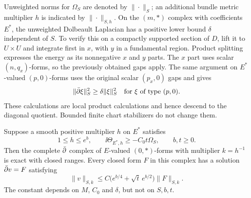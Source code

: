 Unweighted norms for $\Omega_S$ are denoted by $\|\cdot\|_S$; an
additional bundle metric multiplier $h$ is indicated by
$\|\cdot\|_{S,h}$.  On the $(m,*)$ complex with coefficients $E^*$,
the unweighted Dolbeault Laplacian has a positive lower bound $\delta$
independent of $S$.  To verify this on a compactly supported section of
$D$, lift it to $U\times U$ and integrate first in $x$, with $y$ in a
fundamental region.  Product splitting expresses the energy as its
nonnegative $x$ and $y$ parts.  The $x$ part uses scalar $(n,q_x)$-forms,
so the previously obtained gaps apply.  The same argument on
$E^*$-valued $(p,0)$-forms uses the original scalar $(p_x,0)$ gaps and
gives
\begin{equation}\label{sp:x-gap}
 \|\bar\partial\xi\|_S^2\ge\delta\|\xi\|_S^2
 \quad\text{for $\xi$ of type $(p,0)$.}
\end{equation}
These calculations are local product calculations and hence descend to
the diagonal quotient.  Bounded finite chart stabilizers do not change
them.

\begin{lemma}\label{sp:weighted-inverse}
Suppose a smooth positive multiplier $h$ on $E^*$ satisfies
\begin{equation}\label{sp:weight-hypotheses}
 1\le h\le e^b,
 \qquad \ii\Theta_{E^*,h}\ge-C_0t\Omega_S,
 \qquad b,t\ge0.
\end{equation}
Then the complete $\bar\partial$ complex of $E$-valued $(0,*)$-forms with
multiplier $k=h^{-1}$ is exact with closed ranges.  Every closed form
$F$ in this complex has a solution $\bar\partial v=F$ satisfying
\begin{equation}\label{sp:weighted-solution}
 \|v\|_{S,k}\le
 C\bigl(e^{b/4}+\sqrt t\,e^{b/2}\bigr)\|F\|_{S,k}.
\end{equation}
The constant depends on $M$, $C_0$ and $\delta$, but not on $S,b,t$.
\end{lemma}

